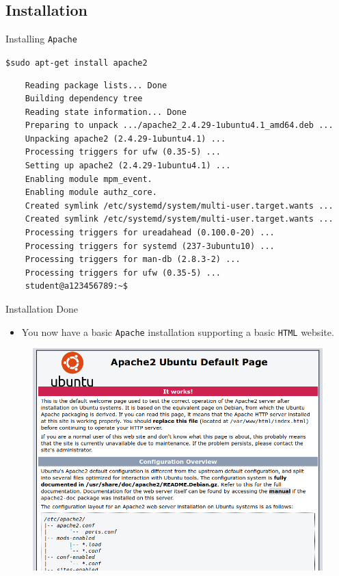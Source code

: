 \documentclass[xcolor=table,aspectratio=169]{beamer}
\begin{document}
\subsection{Installation}
\begin{frame}[fragile]{Installing \texttt{Apache}}
  \begin{tcolorbox}
    \begin{center}
      \scriptsize \texttt{\$sudo apt-get install apache2}
    \end{center}
  \end{tcolorbox}
  \begin{tcolorbox}
    \lstset{
      basicstyle=\tiny\ttfamily,
    }
    \begin{lstlisting}
    Reading package lists... Done
    Building dependency tree
    Reading state information... Done
    Preparing to unpack .../apache2_2.4.29-1ubuntu4.1_amd64.deb ...
    Unpacking apache2 (2.4.29-1ubuntu4.1) ...
    Processing triggers for ufw (0.35-5) ...
    Setting up apache2 (2.4.29-1ubuntu4.1) ...
    Enabling module mpm_event.
    Enabling module authz_core.
    Created symlink /etc/systemd/system/multi-user.target.wants ...
    Created symlink /etc/systemd/system/multi-user.target.wants ...
    Processing triggers for ureadahead (0.100.0-20) ...
    Processing triggers for systemd (237-3ubuntu10) ...
    Processing triggers for man-db (2.8.3-2) ...
    Processing triggers for ufw (0.35-5) ...
    student@a123456789:~$
    \end{lstlisting}
  \end{tcolorbox}
\end{frame}

\begin{frame}{Installation Done}
  \begin{itemize}
    \item You now have a basic \texttt{Apache} installation supporting a basic \texttt{HTML} website.
  \end{itemize}
  \begin{figure}
    \begin{center}
      \includegraphics[width=0.5\linewidth]{IntroPage.png}
    \end{center}
  \end{figure}
\end{frame}
\end{document}

